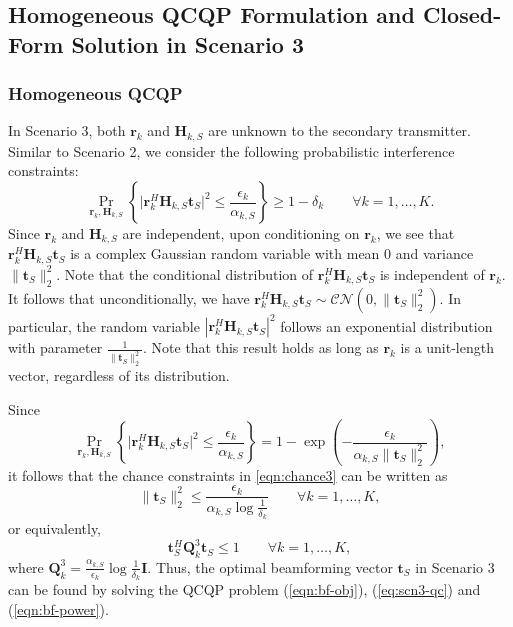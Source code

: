 \documentclass[twocolumn,10pt]{IEEEtran}
\theoremstyle{plain} \newtheorem{theorem}{Theorem}
\theoremstyle{plain} \newtheorem{proposition}{Proposition}
\theoremstyle{plain} \newtheorem{corollary}{Corollary}
\theoremstyle{remark} \newtheorem{remark}{Remark}
\theoremstyle{remark} \newtheorem{lemma}{Lemma}
\theoremstyle{plain} \newtheorem{definition}{Definition}
\theoremstyle{plain} \newtheorem{assumption}{Assumption}
\theoremstyle{plain} \newtheorem{fact}{Fact}
\begin{document}
\subsection{Homogeneous QCQP Formulation and Closed-Form Solution in Scenario 3}\label{subsection:3-4}

\subsubsection{\textbf{Homogeneous QCQP}}

In Scenario 3, both $\mathbf{r}_k$ and $\mathbf{H}_{k,S}$ are unknown to the secondary transmitter. Similar to Scenario 2, we consider the following probabilistic interference constraints:
\begin{equation}\label{eqn:chance3}
   \Pr_{\mathbf{r}_k, \mathbf{H}_{k,S}} \left\{\big| \mathbf{r}_k^H \mathbf{H}_{k,S}\mathbf{t}_S\big|^2 \leq \frac{\epsilon_k}{\alpha_{k,S}} \right\} \geq 1-\delta_k \qquad\forall k=1,\ldots,K.
\end{equation}
Since $\mathbf{r}_k$ and $\mathbf{H}_{k,S}$ are independent, upon conditioning on $\mathbf{r}_k$, we see that $\mathbf{r}_k^H \mathbf{H}_{k,S}\mathbf{t}_S$ is a complex Gaussian random variable with mean 0 and variance $\|\mathbf{t}_S\|_2^2$. Note that the conditional distribution of $\mathbf{r}_k^H \mathbf{H}_{k,S}\mathbf{t}_S$ is independent of $\mathbf{r}_k$. It follows that unconditionally, we have $\mathbf{r}_k^H \mathbf{H}_{k,S}\mathbf{t}_S\sim\mathcal{CN}(0,\|\mathbf{t}_S\|_2^2)$.  In particular, the random variable $|\mathbf{r}_k^H \mathbf{H}_{k,S}\mathbf{t}_S|^2$ follows an exponential distribution with parameter $\frac{1}{\|\mathbf{t}_S\|_2^2}$.  Note that this result holds as long as $\mathbf{r}_k$ is a unit-length vector, regardless of its distribution.

Since
$$ \Pr_{\mathbf{r}_k, \mathbf{H}_{k,S}} \left\{\big| \mathbf{r}_k^H \mathbf{H}_{k,S}\mathbf{t}_S\big|^2 \leq \frac{\epsilon_k}{\alpha_{k,S}}\right\} = 1-\exp\left(-\frac{\epsilon_k}{\alpha_{k,S}\|\mathbf{t}_S\|_2^2}\right), $$
it follows that the chance constraints in \eqref{eqn:chance3} can be written as
\begin{equation} \label{eq:scn3-tnorm}
   \|\mathbf{t}_S\|_2^2\leq \frac{\epsilon_k}{\alpha_{k,S}\log\frac{1}{\delta_k}} \qquad\forall k=1,\ldots,K,
\end{equation}
or equivalently,
\begin{equation} \label{eq:scn3-qc}
   \mathbf{t}_S^H\mathbf{Q}_k^3\mathbf{t}_S \le 1 \qquad\forall k=1,\ldots,K,
\end{equation}
where $\mathbf{Q}_k^3=\frac{\alpha_{k,S}}{\epsilon_k}\log\frac{1}{\delta_k}\mathbf{I}$.  Thus, the optimal beamforming vector $\mathbf{t}_S$ in Scenario 3 can be found by solving the QCQP problem (\ref{eqn:bf-obj}), (\ref{eq:scn3-qc}) and (\ref{eqn:bf-power}).
\end{document}

